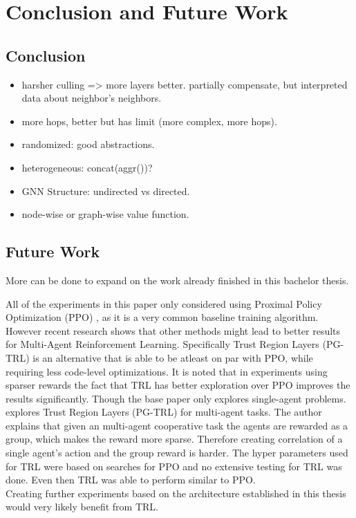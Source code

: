 
\chapter{Conclusion and Future Work}
\label{ch:Conclusion}


\section{Conclusion}
\begin{itemize}[noitemsep,nolistsep]
	\item harsher culling => more layers better. partially compensate, but interpreted data about neighbor's neighbors.
	\item more hops, better but has limit (more complex, more hops).
	\item randomized: good abstractions.
	\item heterogeneous: concat(aggr())?
	\item GNN Structure: undirected vs directed.
	\item node-wise or graph-wise value function.
\end{itemize}


\section{Future Work}
More can be done to expand on the work already finished in this bachelor thesis.\par

All of the experiments in this paper only considered using Proximal Policy Optimization (PPO) \citet{SchulmanWDRK17}, as it is a very common baseline training algorithm.
However recent research shows that other methods might lead to better results for Multi-Agent Reinforcement Learning.
Specifically Trust Region Layers (PG-TRL) \citet{otto2021differentiable} is an alternative that is able to be atleast on par with PPO, while requiring less code-level optimizations. It is noted that in experiments using sparser rewards the fact that TRL has better exploration over PPO improves the results significantly. Though the base paper only explores single-agent problems.
\citet{RobinRuede2021} explores Trust Region Layers (PG-TRL) \citet{otto2021differentiable} for multi-agent tasks. The author explains that given an multi-agent cooperative task the agents are rewarded as a group, which makes the reward more sparse. Therefore creating correlation of a single agent's action and the group reward is harder. The hyper parameters used for TRL were based on searches for PPO and no extensive testing for TRL was done. Even then TRL was able to perform similar to PPO.\\
Creating further experiments based on the architecture established in this thesis would very likely benefit from TRL. \par

